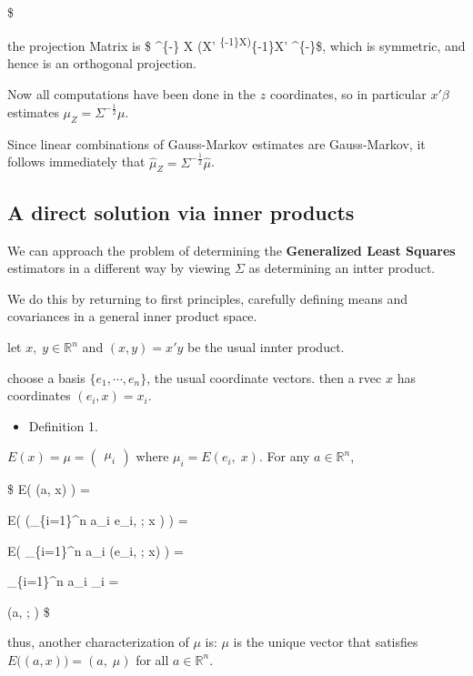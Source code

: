 \documentclass[
]{book}
\providecommand{\tightlist}{%
  \setlength{\itemsep}{0pt}\setlength{\parskip}{0pt}}
\begin{document}
{{{\begin{align}
\end{align}
\$

the projection Matrix is \$ \Sigma\^{}\{-\} X (X' \Sigma\textsuperscript{\{-1\}X)}\{-1\}X' \Sigma\^{}\{-\}\$, which is symmetric, and hence is an orthogonal projection.

Now all computations have been done in the \(z\) coordinates, so in particular \(x' \beta\) estimates \(\mu_Z = \Sigma^{-\tfrac{1}{2}} \mu\).

Since linear combinations of Gauss-Markov estimates are Gauss-Markov, it follows immediately that \(\hat \mu_Z = \Sigma^{-\tfrac{1}{2}} \hat \mu\).

\hypertarget{a-direct-solution-via-inner-products}{%
\subsection{A direct solution via inner products}\label{a-direct-solution-via-inner-products}}

We can approach the problem of determining the \textbf{Generalized Least Squares} estimators in a different way by viewing \(\Sigma\) as determining an intter product.

We do this by returning to first principles, carefully defining means and covariances in a general inner product space.

let \(x, \; y \in \mathbb{R}^n\) and \((x,y) = x'y\) be the usual innter product.

choose a basis \(\{e_1 , \cdots, e_n \}\), the usual coordinate vectors. then a rvec \(x\) has coordinates \((e_i, x) = x_i\).

\begin{itemize}
\tightlist
\item
  Definition 1.
\end{itemize}

\(E(x)=\mu= \begin{pmatrix} \mu_i \end{pmatrix}\) where \(\mu_i = E(e_i , \; x)\). For any \(a \in \mathbb{R}^n\),

\$
E\Big( (a, x) \Big) =

E\Bigg( \Big(\sum\_\{i=1\}\^{}n a\_i e\_i, ; x \Big) \Bigg) =

E\Bigg( \sum\_\{i=1\}\^{}n a\_i (e\_i, ; x) \Bigg) =

\sum\_\{i=1\}\^{}n a\_i \mu\_i =

(a, ; \mu)
\$

thus, another characterization of \(\mu\) is: \(\mu\) is the unique vector that satisfies \(E\Big( (a, x) \Big) = (a, \; \mu)\) for all \(a \in \mathbb{R}^n\).

}}}
\end{document}
